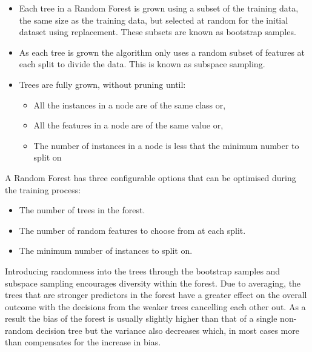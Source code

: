 	\begin{itemize}
		\item Each tree in a Random Forest is grown using a subset of the training data, the same size as the training data, but selected at random for the initial dataset using replacement. These subsets are known as bootstrap samples.
		\item As each tree is grown the algorithm only uses a random subset of features at each split to divide the data. This is known as subspace sampling.
		\item Trees are fully grown, without pruning until:
			\begin{itemize}
				\item All the instances in a node are of the same class or,
				\item All the features in a node are of the same value or,
				\item The number of instances in a node is less that the minimum number to split on
			\end{itemize}
	\end{itemize}
	
	A Random Forest has three configurable options that can be optimised during the training process:
	\begin{itemize}
		\item The number of trees in the forest.
		\item The number of random features to choose from at each split.
		\item The minimum number of instances to split on.
	\end{itemize}
	
	Introducing randomness into the trees through the bootstrap samples and subspace sampling encourages diversity within the forest. Due to averaging, the trees that are stronger predictors in the forest have a greater effect on the overall outcome with the decisions from the weaker trees cancelling each other out. As a result the bias of the forest is usually slightly higher than that of a single non-random decision tree but the variance also decreases which, in most cases more than compensates for the increase in bias.
	
